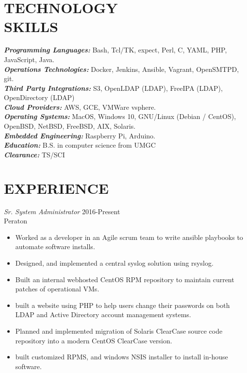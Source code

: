 \documentclass[margin, 10pt]{res} %
\begin{document}
\begin{resume}


\section{TECHNOLOGY \\ SKILLS}

{\sl \textbf{Programming Languages:}} Bash, Tcl/TK, expect, Perl, C, YAML, PHP, JavaScript, Java. \\
{\sl \textbf{Operations Technologies:}} Docker, Jenkins, Ansible, Vagrant, OpenSMTPD, git. \\
{\sl \textbf{Third Party Integrations:}} S3, OpenLDAP (LDAP), FreeIPA (LDAP), OpenDirectory (LDAP) \\
{\sl \textbf{Cloud Providers:}} AWS, GCE, VMWare vsphere. \\
{\sl \textbf{Operating Systems:}} MacOS, Windows 10, GNU/Linux (Debian / CentOS), OpenBSD, NetBSD, FreeBSD, AIX, Solaris. \\
{\sl \textbf{Embedded Engineering:}} Raspberry Pi, Arduino. \\
{\sl \textbf{Education:}} B.S. in computer science from UMGC\\
{\sl \textbf{Clearance:}} TS/SCI \\


\section{EXPERIENCE}

{\sl Sr. System Administrator } \hfill 2016-Present \\
Peraton
\begin{itemize}
  \item Worked as a developer in an Agile scrum team to write ansible playbooks to automate software installs.
  \item Designed, and implemented a central syslog solution using rsyslog.
  \item Built an internal webhosted CentOS RPM repository to maintain current patches of operational VMs.
  \item built a website using PHP to help users change their passwords on both LDAP and Active Directory account management systems.
  \item Planned and implemented migration of Solaris ClearCase source code repository into a modern CentOS ClearCase version.
  \item built customized RPMS, and windows NSIS installer to install in-house software.
\end{itemize}


\end{resume}
\end{document}
